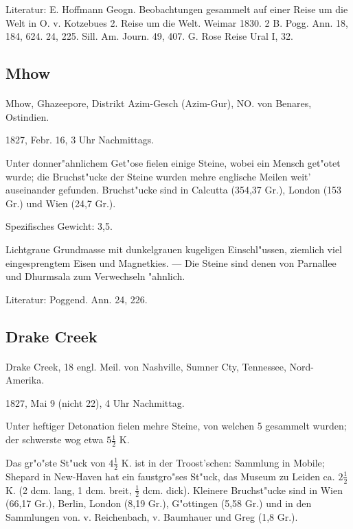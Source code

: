 \documentclass[a4paper, 11pt, oneside]{article}
\begin{document}
\footnotesize
Literatur: E. Hoffmann Geogn. Beobachtungen gesammelt auf einer Reise um die Welt in O. v. Kotzebues 2. Reise um die Welt. Weimar 1830. 2 B. Pogg. Ann. 18, 184, 624. 24, 225. Sill. Am. Journ. 49, 407. G. Rose Reise Ural I, 32.

\subsection{Mhow}
\normalsize
\paragraph{}
Mhow, Ghazeepore, Distrikt Azim-Gesch (Azim-Gur), NO. von Benares, Ostindien.

1827, Febr. 16, 3 Uhr Nachmittags.

Unter donner"ahnlichem Get"ose fielen einige Steine, wobei ein Mensch get"otet wurde; die Bruchst"ucke der Steine wurden mehre englische Meilen weit' auseinander gefunden. Bruchst"ucke sind in Calcutta (354,37 Gr.), London (153 Gr.) und Wien (24,7 Gr.).

Spezifisches Gewicht: 3,5.

Lichtgraue Grundmasse mit dunkelgrauen kugeligen Einschl"ussen, ziemlich viel eingesprengtem Eisen und Magnetkies. --- Die Steine sind denen von Parnallee und Dhurmsala zum Verwechseln "ahnlich.

\footnotesize
Literatur: Poggend. Ann. 24, 226.

\subsection{Drake Creek}
\normalsize
\paragraph{}
Drake Creek, 18 engl. Meil. von Nashville, Sumner Cty, Tennessee, Nord-Amerika.

1827, Mai 9 (nicht 22), 4 Uhr Nachmittag.

Unter heftiger Detonation fielen mehre Steine, von welchen 5 gesammelt wurden; der schwerste wog etwa $5\frac{1}{2}$ K.

Das gr"o"ste St"uck von $4\frac{1}{2}$ K. ist in der Troost'schen: Sammlung in Mobile; Shepard in New-Haven hat ein faustgro"ses St"uck, das Museum zu Leiden ca. $2\frac{1}{2}$ K. (2 dcm. lang, 1 dcm. breit, $\frac{1}{2}$ dcm. dick). Kleinere Bruchst"ucke sind in Wien (66,17 Gr.), Berlin, London (8,19 Gr.), G"ottingen (5,58 Gr.) und in den Sammlungen von. v. Reichenbach, v. Baumhauer und Greg (1,8 Gr.).
\end{document}
